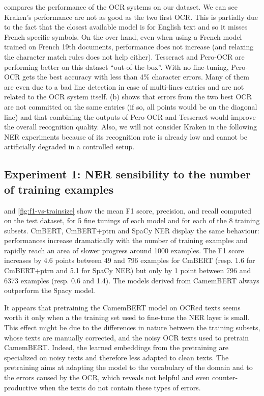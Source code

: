  compares the performance of the OCR systems on our dataset. We can see Kraken's performance are
not as good as the two first OCR. This is partially due to the fact that the closest available model is for English text
and so it misses French specific symbols. On the over hand, even when using a French model trained on French 19th
documents, performance does not increase (and relaxing the character match rules does not help either). Tesseract and
Pero-OCR are performing better on this dataset ``out-of-the-box''. With no fine-tuning, Pero-OCR gets the best accuracy
with less than 4\% character errors. Many of them are even due to a bad line detection in case of multi-lines entries
and are not related to the OCR system itself.  (b) shows that errors from the two best OCR are not
committed on the same entries (if so, all points would be on the diagonal line) and that combining the outputs of
Pero-OCR and Tesseract would improve the overall recognition quality. Also, we will not consider Kraken in the following
NER experiments because of its recognition rate is already low and cannot be artificially degraded in a controlled setup.


\subsection{Experiment 1: NER sensibility to the number of training examples}
 and \cref{fig:f1-vs-trainsize} show the mean F1 score, precision, and recall computed on the test dataset, for 5 fine tunings of each model and for each of the 8 training subsets.
CmBERT, CmBERT+ptrn and SpaCy NER display the same behaviour: performances increase dramatically with the number of training examples and rapidly reach an area of slower progress around 1000 examples.
The F1 score increases by 4.6 points between 49 and 796 examples for CmBERT (resp. 1.6 for CmBERT+ptrn and 5.1 for SpaCy NER) but only by 1 point between 796 and 6373 examples (resp. 0.6 and 1.4).
The models derived from CamemBERT always outperform the Spacy model.

It appears that pretraining the CamemBERT model on OCRed texts seems worth it only when a the training set used to fine-tune the NER layer is small.
This effect might be due to the differences in nature between the training subsets, whose texts are manually corrected, and the noisy OCR texts used to pretrain CamemBERT.
Indeed, the learned embeddings from the pretraining are specialized on noisy texts and therefore less adapted to clean texts.
The pretraining aims at adapting the model to the vocabulary of the domain and to the errors caused by the OCR, which reveals not helpful and even counter-productive when the texts do not contain these types of errors.


